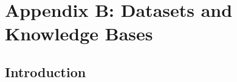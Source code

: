 
\chapter{Appendix B: Datasets and Knowledge Bases}
\label{appendix:datasets}

\section{Introduction}
\label{appendix:datasets:intro}

 